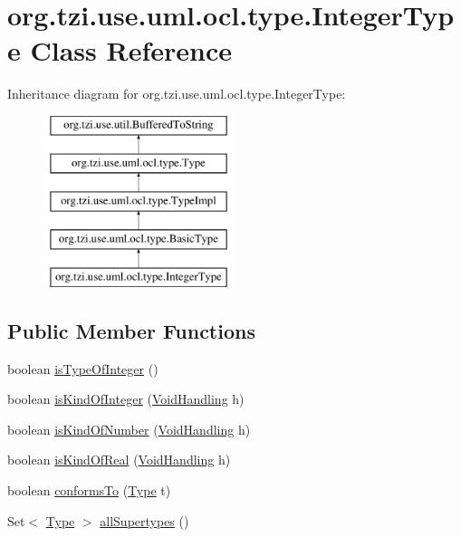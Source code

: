 \hypertarget{classorg_1_1tzi_1_1use_1_1uml_1_1ocl_1_1type_1_1_integer_type}{\section{org.\-tzi.\-use.\-uml.\-ocl.\-type.\-Integer\-Type Class Reference}
\label{classorg_1_1tzi_1_1use_1_1uml_1_1ocl_1_1type_1_1_integer_type}
}
Inheritance diagram for org.\-tzi.\-use.\-uml.\-ocl.\-type.\-Integer\-Type\-:\begin{figure}[H]
\begin{center}
\leavevmode
\includegraphics[height=5.000000cm]{classorg_1_1tzi_1_1use_1_1uml_1_1ocl_1_1type_1_1_integer_type}
\end{center}
\end{figure}
\subsection*{Public Member Functions}
\begin{DoxyCompactItemize}
\item 
boolean \hyperlink{classorg_1_1tzi_1_1use_1_1uml_1_1ocl_1_1type_1_1_integer_type_a35d86932db158e863ccf5e32477a57b8}{is\-Type\-Of\-Integer} ()
\item 
boolean \hyperlink{classorg_1_1tzi_1_1use_1_1uml_1_1ocl_1_1type_1_1_integer_type_ab86ef8184e6b3631eaa1db39e123489e}{is\-Kind\-Of\-Integer} (\hyperlink{enumorg_1_1tzi_1_1use_1_1uml_1_1ocl_1_1type_1_1_type_1_1_void_handling}{Void\-Handling} h)
\item 
boolean \hyperlink{classorg_1_1tzi_1_1use_1_1uml_1_1ocl_1_1type_1_1_integer_type_aefdb32e56a175586c8036e98111ece13}{is\-Kind\-Of\-Number} (\hyperlink{enumorg_1_1tzi_1_1use_1_1uml_1_1ocl_1_1type_1_1_type_1_1_void_handling}{Void\-Handling} h)
\item 
boolean \hyperlink{classorg_1_1tzi_1_1use_1_1uml_1_1ocl_1_1type_1_1_integer_type_ade81b5f80c4a60400182058adfeb32fc}{is\-Kind\-Of\-Real} (\hyperlink{enumorg_1_1tzi_1_1use_1_1uml_1_1ocl_1_1type_1_1_type_1_1_void_handling}{Void\-Handling} h)
\item 
boolean \hyperlink{classorg_1_1tzi_1_1use_1_1uml_1_1ocl_1_1type_1_1_integer_type_ab7f1c0392ebf0add4238fa11ceff7b6d}{conforms\-To} (\hyperlink{interfaceorg_1_1tzi_1_1use_1_1uml_1_1ocl_1_1type_1_1_type}{Type} t)
\item 
Set$<$ \hyperlink{interfaceorg_1_1tzi_1_1use_1_1uml_1_1ocl_1_1type_1_1_type}{Type} $>$ \hyperlink{classorg_1_1tzi_1_1use_1_1uml_1_1ocl_1_1type_1_1_integer_type_a63fa48cf20a6443ebe4271c3113629dc}{all\-Supertypes} ()
\end{DoxyCompactItemize}
